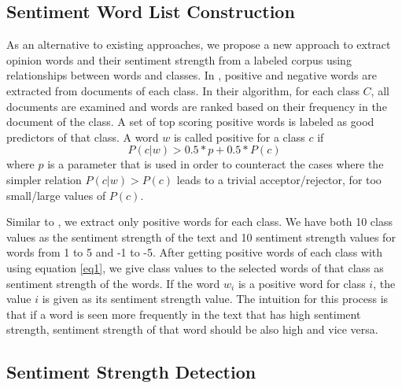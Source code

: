 \documentclass[12pt]{article}
\begin{document}
\subsection{Sentiment Word List Construction}
\label{swlc} 
As an alternative to existing approaches, we propose a new approach to extract opinion words and their sentiment strength from a labeled corpus using relationships between words and classes. In \cite{Dimitris'05}, positive and negative words are extracted from documents of
each class. In their algorithm, for each class $C$, all documents are examined and words are ranked based on their frequency in the document of the class. A set of top scoring positive words is labeled as good predictors of that class. A word $w$ is called positive for a class $c$ if \begin{equation}
P(c|w)>0.5*p+0.5*P(c)\label{eq1}
\end{equation} where $p$ is a parameter that is used in order to counteract the cases where the simpler relation $ P(c|w)>P(c)$ leads to a trivial acceptor/rejector, for too small/large values of $P(c)$.

 Similar to \cite{Dimitris'05}, we extract only positive words for each class.
We have both 10 class values as the sentiment strength of the text and 10 sentiment strength values for words from 1 to 5 and -1 to -5. After getting positive words of each class with using equation \ref{eq1}, we give class values to the selected words of that class as sentiment strength of the words. If the word $w_i$ is a positive word for class $i$, the value $i$ is given as its sentiment strength value. The intuition for this process is that if a word is seen more frequently in the text that has high sentiment strength, sentiment strength of that word should be also high and vice versa.

\subsection{Sentiment Strength Detection}
\end{document}
